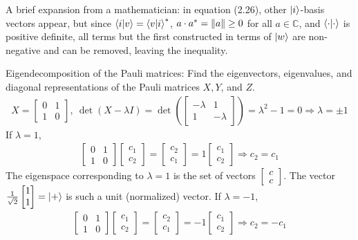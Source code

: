  A brief expansion from a mathematician: in equation (2.26), other $\ket{i}$-basis vectors appear, but since $\braket{i|v}=\braket{v|i}^*$, $a\cdot a^* = \left\lVert a\right\rVert \geq 0$ for all $a\in\mathbb{C}$, and $\braket{\cdot | \cdot}$ is positive definite, all terms but the first constructed in terms of $\ket{w}$ are non-negative and can be removed, leaving the inequality.

 Eigendecomposition of the Pauli matrices: Find the eigenvectors, eigenvalues, and diagonal representations of the Pauli matrices $X, Y$, and $Z$.
\Soln
\begin{align*}
	X = \begin{bmatrix}
	0 & 1 \\
	1 & 0
	\end{bmatrix},\ \det(X-\lambda I) =
	\det \left(\begin{bmatrix}
	-\lambda & 1 \\
	1 & -\lambda
	\end{bmatrix} \right) = \lambda^2-1 = 0 \Rightarrow \lambda = \pm 1
\end{align*}
If $\lambda = 1$,
\begin{align*}
	\begin{bmatrix}
		0 & 1 \\
		1 & 0
	\end{bmatrix}
	\begin{bmatrix}
		c_1 \\
		c_2
	\end{bmatrix} =
	\begin{bmatrix}
	      c_2 \\
	      c_1
	\end{bmatrix} =
	 1
	\begin{bmatrix}
		c_1 \\
		c_2
	\end{bmatrix}
	\Rightarrow c_2 = c_1
\end{align*}
The eigenspace corresponding to $\lambda = 1$ is the set of vectors $\begin{bmatrix}c \\ c\end{bmatrix}$.  The vector $\frac{1}{\sqrt{2}}\begin{bmatrix} 1 \\ 1\end{bmatrix} = \ket{+}$ is such a unit (normalized) vector. 
If $\lambda = -1$,
\begin{align*}
	\begin{bmatrix}
		0 & 1 \\
		1 & 0
	\end{bmatrix}
	\begin{bmatrix}
		c_1 \\
		c_2
	\end{bmatrix} =
	\begin{bmatrix}
	      c_2 \\
	      c_1
	\end{bmatrix} =
	 -1
	\begin{bmatrix}
		c_1 \\
		c_2
	\end{bmatrix}
	\Rightarrow c_2 = -c_1
\end{align*}
